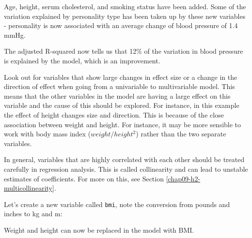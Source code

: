 \documentclass[
  12pt,
  krantz2]{krantz}
\makeatletter
\newenvironment{Shaded}{\begin{snugshade}}{\end{snugshade}}
\newcommand{\DataTypeTok}[1]{\textcolor[rgb]{0.13,0.29,0.53}{#1}}
\newcommand{\DecValTok}[1]{\textcolor[rgb]{0.00,0.00,0.81}{#1}}
\newcommand{\FloatTok}[1]{\textcolor[rgb]{0.00,0.00,0.81}{#1}}
\newcommand{\KeywordTok}[1]{\textcolor[rgb]{0.13,0.29,0.53}{\textbf{#1}}}
\newcommand{\NormalTok}[1]{#1}
\newcommand{\OperatorTok}[1]{\textcolor[rgb]{0.81,0.36,0.00}{\textbf{#1}}}
\newcommand{\OtherTok}[1]{\textcolor[rgb]{0.56,0.35,0.01}{#1}}
\newcommand{\StringTok}[1]{\textcolor[rgb]{0.31,0.60,0.02}{#1}}
\newenvironment{kframe}{%
\medskip{}
\setlength{\fboxsep}{.8em}
 \def\at@end@of@kframe{}%
 \ifinner\ifhmode%
  \def\at@end@of@kframe{\end{minipage}}%
  \begin{minipage}{\columnwidth}%
 \fi\fi%
 \def\FrameCommand##1{\hskip\@totalleftmargin \hskip-\fboxsep
 \colorbox{shadecolor}{##1}\hskip-\fboxsep
     \hskip-\linewidth \hskip-\@totalleftmargin \hskip\columnwidth}%
 \MakeFramed {\advance\hsize-\width
   \@totalleftmargin\z@ \linewidth\hsize
   \@setminipage}}%
 {\par\unskip\endMakeFramed%
 \at@end@of@kframe}
\renewenvironment{Shaded}{\begin{kframe}}{\end{kframe}}
\makeatother
\begin{document}
Age, height, serum cholesterol, and smoking status have been added.
Some of the variation explained by personality type has been taken up by these new variables - personality is now associated with an average change of blood pressure of 1.4 mmHg.

The adjusted R-squared now tells us that 12\% of the variation in blood pressure is explained by the model, which is an improvement.

Look out for variables that show large changes in effect size or a change in the direction of effect when going from a univariable to multivariable model.
This means that the other variables in the model are having a large effect on this variable and the cause of this should be explored.
For instance, in this example the effect of height changes size and direction.
This is because of the close association between weight and height.
For instance, it may be more sensible to work with body mass index (\(weight / height^2\)) rather than the two separate variables.

In general, variables that are highly correlated with each other should be treated carefully in regression analysis.
This is called collinearity and can lead to unstable estimates of coefficients.
For more on this, see Section \ref{chap09-h2-multicollinearity}.

Let's create a new variable called \texttt{bmi}, note the conversion from pounds and inches to kg and m:

\begin{Shaded}
\end{Shaded}

Weight and height can now be replaced in the model with BMI.

\begin{Shaded}
\end{Shaded}
\end{document}
